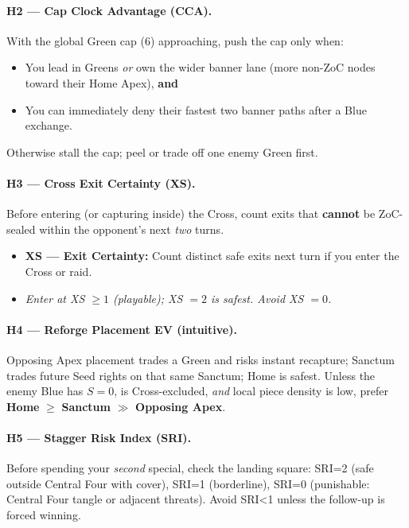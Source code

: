 \documentclass[11pt]{article}
\begin{document}
\paragraph{H2 — Cap Clock Advantage (CCA).}
With the global Green cap (6) approaching, push the cap only when:
\begin{itemize}
  \item You lead in Greens \emph{or} own the wider banner lane (more non-ZoC nodes toward their Home Apex), \textbf{and}
  \item You can immediately deny their fastest two banner paths after a Blue exchange.
\end{itemize}
Otherwise stall the cap; peel or trade off one enemy Green first.

\paragraph{H3 — Cross Exit Certainty (XS).}
Before entering (or capturing inside) the Cross, count exits that \textbf{cannot} be ZoC-sealed within the opponent’s next \emph{two} turns.
\begin{itemize}
  \item \textbf{XS — Exit Certainty:} Count distinct safe exits next turn if you enter the Cross or raid. 
  \item \emph{Enter at XS $\ge 1$ (playable); XS $=2$ is safest. Avoid XS $=0$.}
\end{itemize}

\paragraph{H4 — Reforge Placement EV (intuitive).}
Opposing Apex placement trades a Green and risks instant recapture; Sanctum trades future Seed rights on that same Sanctum; Home is safest. Unless the enemy Blue has $S=0$, is Cross-excluded, \emph{and} local piece density is low, prefer \textbf{Home} $\ge$ \textbf{Sanctum} $\gg$ \textbf{Opposing Apex}.

\paragraph{H5 — Stagger Risk Index (SRI).}
Before spending your \emph{second} special, check the landing square:
SRI=2 (safe outside Central Four with cover), SRI=1 (borderline), SRI=0 (punishable: Central Four tangle or adjacent threats).
Avoid SRI<1 unless the follow-up is forced winning.

\bigskip
\end{document}
